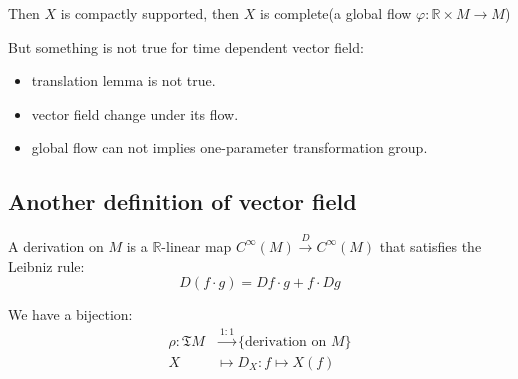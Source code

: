 Then  $ X  $ is compactly supported, then  $ X $ is complete(\ie a global flow  $ \varphi:\mathbb{R}\times M \rightarrow M$)

But something is not true for time dependent vector field:
\begin{itemize}
    \item translation lemma is not true.
    \item vector field change under its flow.
    \item global flow can not implies one-parameter transformation group.
\end{itemize}
\subsection{Another definition of vector field}
A derivation on   $ M  $ is a  $ \mathbb{R} $-linear map  $ C^\infty(M)\xrightarrow{D}C^\infty(M) $ that satisfies the Leibniz rule:
\[D(f\cdot g)=Df\cdot g+f\cdot Dg\] 
\begin{theorem}

    We have a bijection:
    \begin{align*}
        \rho:\mathfrak{T}M&\xrightarrow{1:1}\{\text{derivation on }M\}\\
        X&\mapsto D_X:f\mapsto X(f)
    \end{align*}
\end{theorem} 
